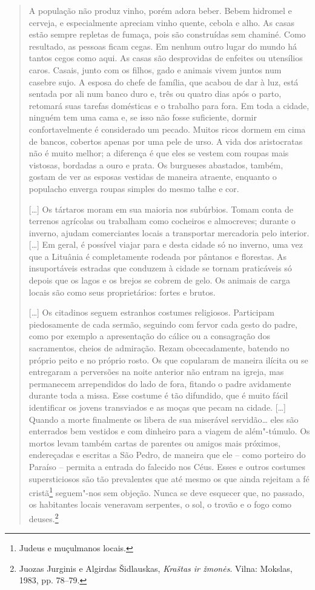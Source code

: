\begin{quote}
A população não produz vinho, porém adora beber. Bebem hidromel e
cerveja, e especialmente apreciam vinho quente, cebola e alho. As casas
estão sempre repletas de fumaça, pois são construídas sem chaminé. Como
resultado, as pessoas ficam cegas. Em nenhum outro lugar do mundo há
tantos cegos como aqui. As casas são desprovidas de enfeites ou
utensílios caros. Casais, junto com os filhos, gado e animais vivem
juntos num casebre sujo. A esposa do chefe de família, que acabou de dar
à luz, está sentada por ali num banco duro e, três ou quatro dias após o
parto, retomará suas tarefas domésticas e o trabalho para fora. Em toda
a cidade, ninguém tem uma cama e, se isso não fosse suficiente, dormir
confortavelmente é considerado um pecado. Muitos ricos dormem em cima de
bancos, cobertos apenas por uma pele de urso. A vida dos aristocratas
não é muito melhor; a diferença é que eles se vestem com roupas mais
vistosas, bordadas a ouro e prata. Os burgueses abastados, também,
gostam de ver as esposas vestidas de maneira atraente, enquanto o
populacho enverga roupas simples do mesmo talhe e cor.

[\ldots{}] Os tártaros moram em sua maioria nos subúrbios. Tomam conta de
terrenos agrícolas ou trabalham como cocheiros e almocreves; durante o
inverno, ajudam comerciantes locais a transportar mercadoria pelo
interior. [\ldots{}] Em geral, é possível viajar para e desta cidade só no
inverno, uma vez que a Lituânia é completamente rodeada por pântanos e
florestas. As insuportáveis estradas que conduzem à cidade se tornam
praticáveis só depois que os lagos e os brejos se cobrem de gelo. Os
animais de carga locais são como seus proprietários: fortes e brutos.

[\ldots{}] Os citadinos seguem estranhos costumes religiosos. Participam
piedosamente de cada sermão, seguindo com fervor cada gesto do padre,
como por exemplo a apresentação do cálice ou a consagração dos
sacramentos, cheios de admiração. Rezam obcecadamente, batendo no
próprio peito e no próprio rosto. Os que copularam de maneira ilícita ou
se entregaram a perversões na noite anterior não entram na igreja, mas
permanecem arrependidos do lado de fora, fitando o padre avidamente
durante toda a missa. Esse costume é tão difundido, que é muito fácil
identificar os jovens transviados e as moças que pecam na cidade.
[\ldots{}] Quando a morte finalmente os libera de sua miserável
servidão\ldots{} eles são enterrados bem vestidos e com dinheiro para a
viagem de além"-túmulo. Os mortos levam também cartas de parentes ou
amigos mais próximos, endereçadas e escritas a São Pedro, de maneira que
ele -- como porteiro do Paraíso -- permita a entrada do falecido nos Céus.
Esses e outros costumes supersticiosos são tão prevalentes que até mesmo
os que ainda rejeitam a fé cristã\footnote{Judeus e muçulmanos locais.} 
seguem"-nos sem objeção. Nunca se deve esquecer que, no passado, os
habitantes locais veneravam serpentes, o sol, o trovão e o fogo como
deuses.\footnote{Juozas Jurginis e Algirdas Šidlauskas, \textit{Kraštas ir žmonės}. Vilna: Mokslas, 1983, pp. 78--79.}
\end{quote}

